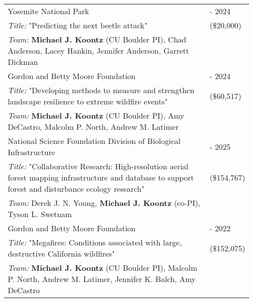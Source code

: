 \begin{longtable}{@{}>{\raggedright}p{5.25in} @{} >{\raggedleft}X@{}}


Yosemite National Park & 2023 - 2024 \tabularnewline
\addtolength{\leftskip}{5ex}\emph{Title:} "Predicting the next beetle attack" & (\$20,000) \tabularnewline
\addtolength{\leftskip}{5ex}\emph{Team:} \textbf{Michael J. Koontz} (CU Boulder PI), Chad Anderson, Lacey Hankin, Jennifer Anderson, Garrett Dickman & \tabularnewline

Gordon and Betty Moore Foundation & 2023 - 2024 \tabularnewline
\addtolength{\leftskip}{5ex}\emph{Title:} "Developing methods to measure and strengthen landscape resilience to extreme wildfire events" & (\$60,517) \tabularnewline
\addtolength{\leftskip}{5ex}\emph{Team:} \textbf{Michael J. Koontz} (CU Boulder PI), Amy DeCastro, Malcolm P. North, Andrew M. Latimer & \tabularnewline


National Science Foundation Division of Biological Infrastructure & 2022 - 2025 \tabularnewline
\addtolength{\leftskip}{5ex}\emph{Title:} "Collaborative Research: High-resolution aerial forest mapping infrastructure and database to support forest and disturbance ecology research" & (\$154,767) \tabularnewline
\addtolength{\leftskip}{5ex}\emph{Team:} Derek J. N. Young, \textbf{Michael J. Koontz} (co-PI), Tyson L. Swetnam & \tabularnewline

Gordon and Betty Moore Foundation & 2020 - 2022 \tabularnewline
\addtolength{\leftskip}{5ex}\emph{Title:} "Megafires: Conditions associated with large, destructive California wildfires" & (\$152,075) \tabularnewline
\addtolength{\leftskip}{5ex}\emph{Team:} \textbf{Michael J. Koontz} (CU Boulder PI), Malcolm P. North, Andrew M. Latimer, Jennifer K. Balch, Amy DeCastro & \tabularnewline


\end{longtable}
